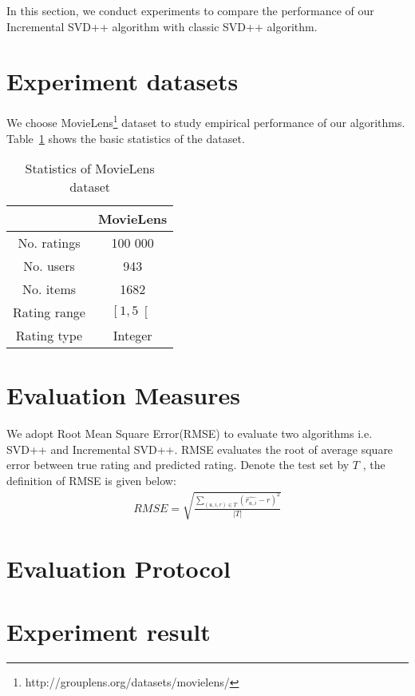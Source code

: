 \documentclass[oneside,13pt]{extreport}
\begin{document}
In this section, we conduct experiments to compare the performance
of our Incremental SVD++ algorithm with classic SVD++ algorithm.

\section{Experiment datasets}
We choose MovieLens\footnote{http://grouplens.org/datasets/movielens/} dataset to study empirical
performance of our algorithms. Table~\ref{tab:MovieLens} shows the basic statistics of the dataset.

\begin{table}[h!]
    \small\centering
    \begin{tabular}{|c|c|}
        \hline
         & MovieLens  \\
        \hline
        No. ratings & 100 000 \\
        \hline
        No. users &  943  \\
        \hline
        No. items &  1682 \\
        \hline
        Rating range & $\left[1, 5\right[$ \\
        \hline
        Rating type &  Integer\\
        \hline
    \end{tabular}
    \label{tab:MovieLens}
    \caption{ Statistics of MovieLens dataset}
\end{table}

\section{Evaluation Measures}
We adopt Root Mean Square Error(RMSE) to evaluate two algorithms i.e. SVD++ and Incremental SVD++.
RMSE evaluates the root of average square error between true rating and predicted rating. Denote the test set by $T$ , the definition of RMSE is given below:
\begin{eqnarray}
\label{eq:RMSE}
RMSE = \sqrt {\frac{{\sum\limits_{(u,i,r) \in T} {{{(\widehat {{r_{u,i}}} - r)}^2}} }}{{\left| T \right|}}} 
 \end{eqnarray}
\section{Evaluation Protocol}
\section{Experiment result}
\end{document}
